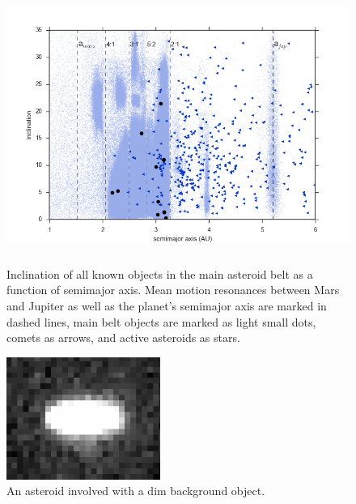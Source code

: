 \documentclass[iop,apj]{emulateapj}
\begin{document}
\begin{figure}[!htb]
    \centering
    \includegraphics[height=9cm]{graphs/aa_comets_mba_all.png}
    \caption{Inclination of all known objects in the main asteroid belt as a function of semimajor axis.  Mean motion resonances between Mars and Jupiter as well as the planet's semimajor axis are marked in dashed lines, main belt objects are marked as light small dots, comets as arrows, and active asteroids as stars. \cite{mpc}}\label{fig:1}
\end{figure}

\begin{figure}[!htb]
    \centering
    \includegraphics[height=4cm]{images/background_gal.jpeg}
    \caption{An asteroid involved with a dim background object. }\label{fig:2}
\end{figure}

%
\end{document}
